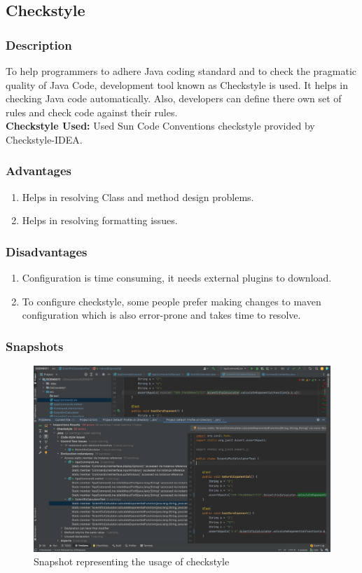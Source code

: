 \documentclass[a4paper,12pt]{report}
\begin{document}
\pagebreak
\subsection{Checkstyle}
\subsubsection{Description} To help programmers to adhere Java coding standard and to check the pragmatic quality of Java Code, development tool known as Checkstyle is used. It helps in checking Java code automatically. Also, developers can define there own set of rules and check code against their rules.
\\\textbf{Checkstyle Used:} Used Sun Code Conventions checkstyle provided by Checkstyle-IDEA.


\subsubsection{Advantages}
\begin{enumerate}
    \item Helps in resolving Class and method design problems.
    \item Helps in resolving formatting issues.
\end{enumerate}
\subsubsection{Disadvantages}
\begin{enumerate}
    \item Configuration is time consuming, it needs external plugins to download.
    \item To configure checkstyle, some people prefer making changes to maven configuration which is also error-prone and takes time to resolve.
\end{enumerate}
\subsubsection{Snapshots}
\pagebreak
\begin{figure}
\includegraphics[width=15cm]{Checkstyle.png}
\caption{Snapshot representing the usage of checkstyle}
\label{exp}
\end{figure}
\end{document}
